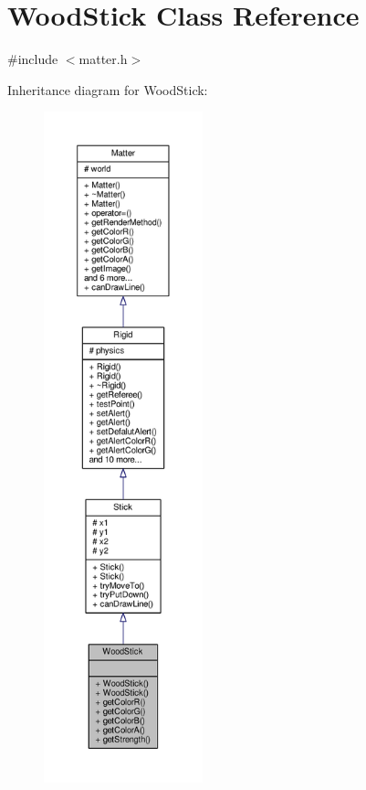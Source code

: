 \hypertarget{classWoodStick}{}\section{Wood\+Stick Class Reference}
\label{classWoodStick}


{\ttfamily \#include $<$matter.\+h$>$}



Inheritance diagram for Wood\+Stick\+:\nopagebreak
\begin{figure}[H]
\begin{center}
\leavevmode
\includegraphics[height=550pt]{classWoodStick__inherit__graph}
\end{center}
\end{figure}


